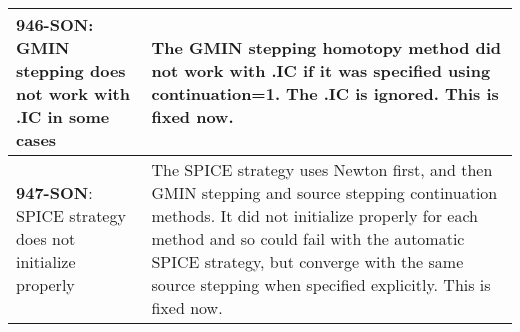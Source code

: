 {\begin{longtable}[h] {>{\raggedright\small}m{2in}|>{\raggedright\let\\\tabularnewline\small}m{3.5in}}
     \textbf{946-SON}: GMIN stepping does not work with .IC in some
     cases & The GMIN stepping homotopy method did not work with .IC
     if it was specified using continuation=1.  The .IC is
     ignored. This is fixed now. \\ \hline

     \textbf{947-SON}: SPICE strategy does not initialize properly &
     The SPICE strategy uses Newton first, and then GMIN stepping and
     source stepping continuation methods. It did not initialize
     properly for each method and so could fail with the automatic
     SPICE strategy, but converge with the same source stepping when
     specified explicitly. This is fixed now. \\ \hline

\end{longtable}
}
